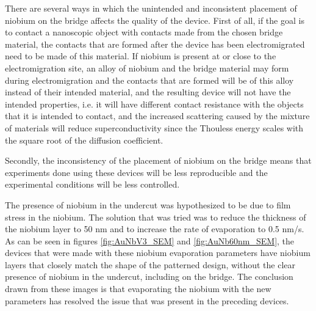 There are several ways in which the unintended and inconsistent placement of niobium on the bridge affects the quality of the device. First of all, if the goal is to contact a nanoscopic object with contacts made from the chosen bridge material, the contacts that are formed after the device has been electromigrated need to be made of this material. If niobium is present at or close to the electromigration site, an alloy of niobium and the bridge material may form during electromigration and the contacts that are formed will be of this alloy instead of their intended material, and the resulting device will not have the intended properties, i.e. it will have different contact resistance with the objects that it is intended to contact, and the increased scattering caused by the mixture of materials will reduce superconductivity since the Thouless energy scales with the square root of the diffusion coefficient. 

Secondly, the inconsistency of the placement of niobium on the bridge means that experiments done using these devices will be less reproducible and the experimental conditions will be less controlled.


The presence of niobium in the undercut was hypothesized to be due to film stress in the niobium. The solution that was tried was to reduce the thickness of the niobium layer to 50 nm and to increase the rate of evaporation to 0.5 nm/s. As can be seen in figures \ref{fig:AuNbV3_SEM} and \ref{fig:AuNb60nm_SEM}, the devices that were made with these niobium evaporation parameters have niobium layers that closely match the shape of the patterned design, without the clear presence of niobium in the undercut, including on the bridge. The conclusion drawn from these images is that evaporating the niobium with the new parameters has resolved the issue that was present in the preceding devices. 

